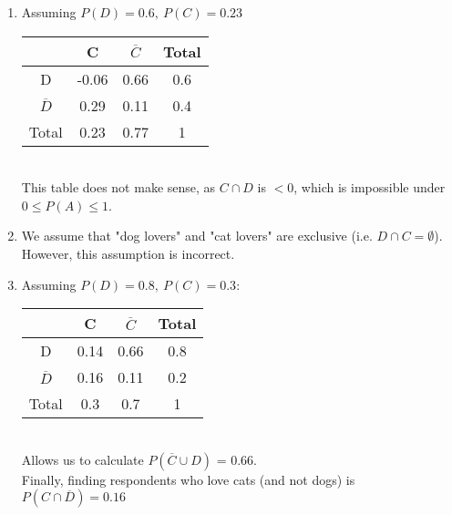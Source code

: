 \documentclass{article}
\begin{document}
\begin{enumerate}[label=\alph*)]
    \item Assuming \(P(D) = 0.6,\ P(C) = 0.23\) \\
    \begin{tabular}{|c|c|c|c|}
        \hline
        & C & \(\overline{C}\) & Total \\
        \hline
        D & -0.06 & 0.66 & 0.6 \\
        \hline
        \(\overline{D}\) & 0.29 & 0.11 & 0.4 \\
        \hline
        Total & 0.23 & 0.77 & 1 \\
        \hline
    \end{tabular} \\
    This table does not make sense, as \(C \cap D\) is \(< 0\), which is impossible under \(0 \le P(A) \le 1\).
    \item We assume that "dog lovers" and "cat lovers" are exclusive (i.e. \(D \cap C = \emptyset\)). \\
    However, this assumption is incorrect.
    \item  Assuming \(P(D) = 0.8,\ P(C) = 0.3\):\\
    \begin{tabular}{|c|c|c|c|}
        \hline
        & C & \(\overline{C}\) & Total \\
        \hline
        D & 0.14 & 0.66 & 0.8 \\
        \hline
        \(\overline{D}\) & 0.16 & 0.11 & 0.2 \\
        \hline
        Total & 0.3 & 0.7 & 1 \\
        \hline
    \end{tabular} \\
    Allows us to calculate \(P(\overline{C} \cup D)\) = 0.66. \\
    Finally, finding respondents who love cats (and not dogs) is \(P(C \cap \overline{D}) = 0.16\)
\end{enumerate}

\pagebreak
\end{document}
